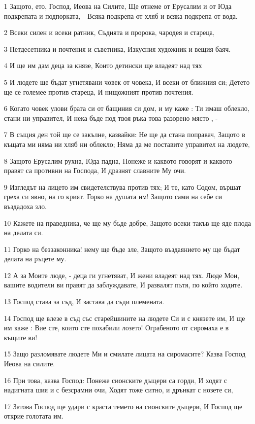 \par 1 Защото, ето, Господ, Иеова на Силите, Ще отнеме от Ерусалим и от Юда подкрепата и подпорката, - Всяка подкрепа от хляб и всяка подкрепа от вода.
\par 2 Всеки силен и всеки ратник, Съдията и пророка, чародея и стареца,
\par 3 Петдесетника и почтения и съветника, Изкусния художник и вещия баяч.
\par 4 И ще им дам деца за князе, Които детински ще владеят над тях
\par 5 И людете ще бъдат угнетявани човек от човека, И всеки от ближния си; Детето ще се големее против стареца, И нищожният против почтения.
\par 6 Когато човек улови брата си от бащиния си дом, и му каже : Ти имаш облекло, стани ни управител, И нека бъде под твоя ръка това разорено място , -
\par 7 В същия ден той ще се закълне, казвайки: Не ще да стана поправач, Защото в къщата ми няма ни хляб ни облекло; Няма да ме поставите управител на людете,
\par 8 Защото Ерусалим рухна, Юда падна, Понеже и каквото говорят и каквото правят са противни на Господа, И дразнят славните Му очи.
\par 9 Изгледът на лицето им свидетелствува против тях; И те, като Содом, вършат греха си явно, на го крият. Горко на душата им! Защото сами на себе си въздадоха зло.
\par 10 Кажете на праведника, че ще му бъде добре, Защото всеки такъв ще яде плода на делата си.
\par 11 Горко на беззаконника! нему ще бъде зле, Защото въздаянието му ще бъдат делата на ръцете му.
\par 12 А за Моите люде, - деца ги угнетяват, И жени владеят над тях. Люде Мои, вашите водители ви правят да заблуждавате, И развалят пътя, по който ходите.
\par 13 Господ става за съд, И застава да съди племената.
\par 14 Господ ще влезе в съд със старейшините на людете Си и с князете им, И ще им каже : Вие сте, които сте похабили лозето! Ограбеното от сиромаха е в къщите ви!
\par 15 Защо разломявате людете Ми и смилате лицата на сиромасите? Казва Господ Иеова на силите.
\par 16 При това, казва Господ: Понеже сионските дъщери са горди, И ходят с надигната шия и с безсрамни очи, Ходят тоже ситно, и дрънкат с нозете си,
\par 17 Затова Господ ще удари с краста темето на сионските дъщери, И Господ ще открие голотата им.
